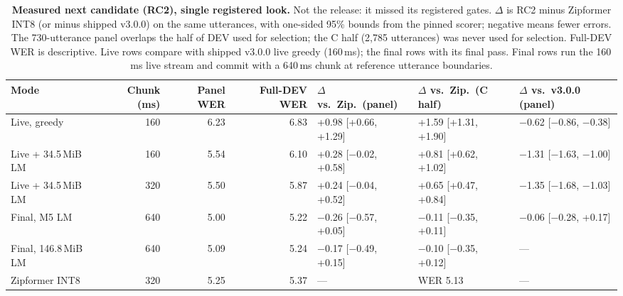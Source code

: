 \begin{table}[t]
\centering
\caption{\textbf{Measured next candidate (RC2), single registered look.} Not the release: it missed its registered gates. $\Delta$ is RC2 minus Zipformer INT8 (or minus shipped v3.0.0) on the same utterances, with one-sided 95\% bounds from the pinned scorer; negative means fewer errors. The 730-utterance panel overlaps the half of DEV used for selection; the C half (2,785 utterances) was never used for selection. Full-DEV WER is descriptive. Live rows compare with shipped v3.0.0 live greedy (160\,ms); the final rows with its final pass. Final rows run the 160\,ms live stream and commit with a 640\,ms chunk at reference utterance boundaries.}
\label{tab:candidate}
\footnotesize
\setlength{\tabcolsep}{4pt}
\begin{tabular}{@{}lrrrlll@{}}
\toprule
Mode & Chunk (ms) & Panel WER & Full-DEV WER & $\Delta$ vs.\ Zip.\ (panel) & $\Delta$ vs.\ Zip.\ (C half) & $\Delta$ vs.\ v3.0.0 (panel) \\
\midrule
Live, greedy & 160 & 6.23 & 6.83 & +0.98 [+0.66, +1.29] & +1.59 [+1.31, +1.90] & $-$0.62 [$-$0.86, $-$0.38] \\
Live + 34.5\,MiB LM & 160 & 5.54 & 6.10 & +0.28 [$-$0.02, +0.58] & +0.81 [+0.62, +1.02] & $-$1.31 [$-$1.63, $-$1.00] \\
Live + 34.5\,MiB LM & 320 & 5.50 & 5.87 & +0.24 [$-$0.04, +0.52] & +0.65 [+0.47, +0.84] & $-$1.35 [$-$1.68, $-$1.03] \\
Final, M5 LM & 640 & 5.00 & 5.22 & $-$0.26 [$-$0.57, +0.05] & $-$0.11 [$-$0.35, +0.11] & $-$0.06 [$-$0.28, +0.17] \\
Final, 146.8\,MiB LM & 640 & 5.09 & 5.24 & $-$0.17 [$-$0.49, +0.15] & $-$0.10 [$-$0.35, +0.12] & --- \\
\midrule
Zipformer INT8 & 320 & 5.25 & 5.37 & --- & WER 5.13 & --- \\
\bottomrule
\end{tabular}
\end{table}

